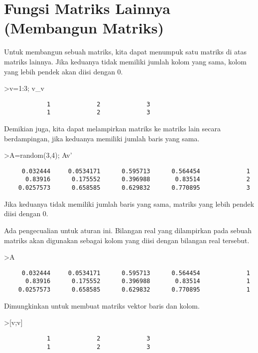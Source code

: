 \documentclass[
]{book}
\begin{document}
\chapter{Fungsi Matriks Lainnya (Membangun Matriks)}\label{fungsi-matriks-lainnya-membangun-matriks}

Untuk membangun sebuah matriks, kita dapat menumpuk satu matriks di atas matriks lainnya. Jika keduanya tidak memiliki jumlah kolom yang sama, kolom yang lebih pendek akan diisi dengan 0.

\textgreater v=1:3; v\_v

\begin{verbatim}
            1             2             3 
            1             2             3 
\end{verbatim}

Demikian juga, kita dapat melampirkan matriks ke matriks lain secara berdampingan, jika keduanya memiliki jumlah baris yang sama.

\textgreater A=random(3,4); A\textbar v'

\begin{verbatim}
     0.032444     0.0534171      0.595713      0.564454             1 
      0.83916      0.175552      0.396988       0.83514             2 
    0.0257573      0.658585      0.629832      0.770895             3 
\end{verbatim}

Jika keduanya tidak memiliki jumlah baris yang sama, matriks yang lebih pendek diisi dengan 0.

Ada pengecualian untuk aturan ini. Bilangan real yang dilampirkan pada sebuah matriks akan digunakan sebagai kolom yang diisi dengan bilangan real tersebut.

\textgreater A

\begin{verbatim}
     0.032444     0.0534171      0.595713      0.564454             1 
      0.83916      0.175552      0.396988       0.83514             1 
    0.0257573      0.658585      0.629832      0.770895             1 
\end{verbatim}

Dimungkinkan untuk membuat matriks vektor baris dan kolom.

\textgreater{[}v;v{]}

\begin{verbatim}
            1             2             3 
            1             2             3 
\end{verbatim}
\end{document}
